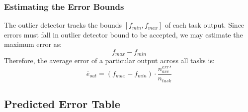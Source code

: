 \documentclass[11pt]{article}
\begin{document}
\subsubsection {Estimating the Error Bounds}
The outlier detector tracks the bounds $[f_{min}, f_{max}]$ of each task output. Since errors must fall in outlier detector bound to be accepted, we may estimate the maximum error as:\\
\[
	f_{max} - f_{min}
\]
Therefore, the average error of a particular output across all tasks is:\\
\[
	\bar e_{out} = (f_{max} - f_{min}) \cdot \frac {n_{acc}^{err}\prime} {n_{task}}
\]

\subsection {Predicted Error Table}
\end{document}
